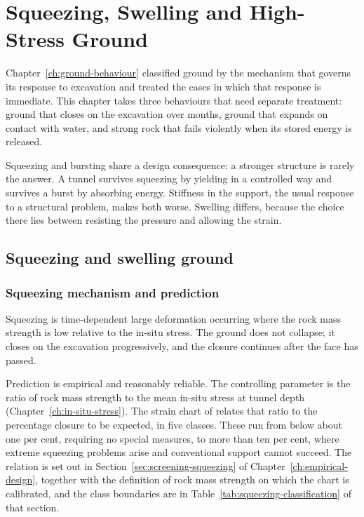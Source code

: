 \chapter{Squeezing, Swelling and High-Stress Ground}
\label{ch:high-stress}

Chapter~\ref{ch:ground-behaviour} classified ground by the mechanism that governs its response to excavation and treated the cases in which that response is immediate. This chapter takes three behaviours that need separate treatment: ground that closes on the excavation over months, ground that expands on contact with water, and strong rock that fails violently when its stored energy is released.

Squeezing and bursting share a design consequence: a stronger structure is rarely the answer. A tunnel survives squeezing by yielding in a controlled way and survives a burst by absorbing energy. Stiffness in the support, the usual response to a structural problem, makes both worse. Swelling differs, because the choice there lies between resisting the pressure and allowing the strain.

\section{Squeezing and swelling ground}
\label{sec:squeezing-swelling}

\subsection{Squeezing mechanism and prediction}
\label{sec:squeezing-prediction}

Squeezing is time-dependent large deformation occurring where the rock mass
strength is low relative to the in-situ stress. The ground does not collapse; it
closes on the excavation progressively, and the closure
continues after the face has passed.

Prediction is empirical and reasonably reliable. The controlling parameter is
the ratio of rock mass strength to the mean in-situ stress at tunnel depth
(Chapter~\ref{ch:in-situ-stress}). The strain chart of
\citet{hoekmarinos2000squeezing} relates that ratio to the percentage closure to be expected,
in five classes. These run from below about one per cent, requiring no special
measures, to more than ten per cent, where extreme squeezing problems arise
and conventional support cannot succeed. The relation is set out in
Section~\ref{sec:screening-squeezing} of Chapter~\ref{ch:empirical-design},
together with the definition of rock mass strength on which the chart is
calibrated, and the class boundaries are in
Table~\ref{tab:squeezing-classification} of that section.

